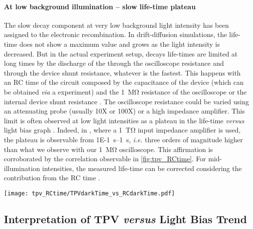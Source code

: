 	\paragraph{At low background illumination -- slow life\hyp{}time plateau}
	The slow decay component at very low background light intensity has been assigned to the electronic recombination.
	In drift-diffusion simulations, the life\hyp{}time does not show a maximum value and grows as the light intensity is decreased.
	But in the actual experiment setup, decays life\hyp{}times are limited at long times by the discharge of the through the oscilloscope resistance and through the device shunt resistance, whatever is the fastest.
	This happens with an RC time of the circuit composed by the capacitance of the device (which can be obtained \textsl{via} a  experiment) and the \SI{1}{\Mohm} resistance of the oscilloscope or the internal device shunt resistance \cite{Tvingstedt2017}.
	The oscilloscope resistance could be varied using an attenuating probe (usually 10X or 100X) or a high impedance amplifier.
	This limit is often observed at low light intensities as a plateau in the  life\hyp{}time \textsl{versus} light bias graph \cite{Tvingstedt2017}.
	Indeed, in , where a \SI{1}{\tera\ohm} input impedance amplifier is used, the plateau is observable from \SIrange{1E-1}{1}{\s}, \textsl{i.e.} three orders of magnitude higher than what we observe with our \SI{1}{\Mohm} oscilloscope.
	This affirmation is corroborated by the correlation observable in \cref{fig:tpv_RCtime}.
	For mid-illumination intensities, the measured life\hyp{}time can be corrected considering the contribution from the RC time \cite{Credgington2014}.

	\begin{SCfigure}
		\centering
		\texttt{[image: tpv\_RCtime/TPVdarkTime\_vs\_RCdarkTime.pdf]}
		\label{fig:tpv_RCtime}
	\end{SCfigure}

	\subsection{Interpretation of TPV \textsl{versus} Light Bias Trend}

